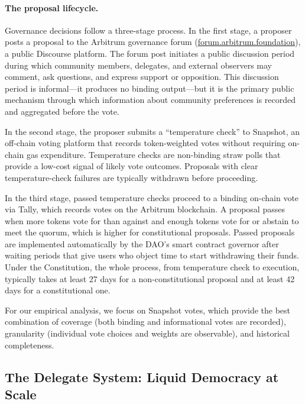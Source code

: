 \documentclass[12pt]{article}
\begin{document}
\paragraph{The proposal lifecycle.}
Governance decisions follow a three-stage process. In the first stage, a proposer
posts a proposal to the Arbitrum governance forum
(\href{https://forum.arbitrum.foundation}{\mbox{forum.arbitrum.foundation}}), a public
Discourse platform. The forum post initiates a public discussion period during which
community members, delegates, and external observers may comment, ask questions, and
express support or opposition. This discussion period is informal---it produces no
binding output---but it is the primary public mechanism through which information about
community preferences is recorded and aggregated before the vote.

In the second stage, the proposer submits a ``temperature check'' to Snapshot, an
off-chain voting platform that records token-weighted votes without requiring
on-chain gas expenditure. Temperature checks are non-binding straw polls that provide a low-cost
signal of likely vote outcomes. Proposals with clear temperature-check failures are
typically withdrawn before proceeding.

In the third stage, passed temperature checks proceed to a binding on-chain vote
via Tally, which records votes on the Arbitrum blockchain. A proposal passes when
more tokens vote for than against and enough tokens vote for or abstain to meet the
quorum, which is higher for constitutional proposals. Passed proposals are implemented
automatically by the DAO's smart contract governor after waiting periods that give users
who object time to start withdrawing their funds. Under the Constitution, the whole process, from
temperature check to execution, typically takes at least 27 days for a non-constitutional
proposal and at least 42 days for a constitutional one.

For our empirical analysis, we focus on Snapshot votes, which provide the best
combination of coverage (both binding and informational votes are recorded),
granularity (individual vote choices and weights are observable), and historical
completeness.

\subsection{The Delegate System: Liquid Democracy at Scale}
\end{document}
